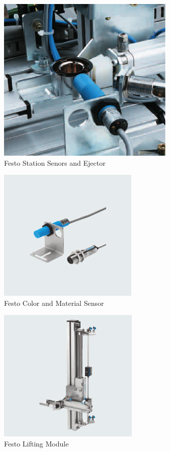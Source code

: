 \begin{figure}[H]
	\begin{center}
		\includegraphics[scale=.50]{media/FestoStation_SensorsAndEjector.png} 	
		\caption{Festo Station Senors and Ejector}
		\label{fig:festostationsensorsandejector}
	\end{center}
\end{figure}

\begin{figure}[H]
	\begin{center}
		\includegraphics[scale=.50]{media/FestoStation_ColorAndMaterialSensor.png} 	
		\caption{Festo Color and Material Sensor}
		\label{fig:festostationcolorandmaterialsensor}
	\end{center}
\end{figure}

\begin{figure}[H]
	\begin{center}
		\includegraphics[scale=.50]{media/FestoStation_LiftingModule.png} 	
		\caption{Festo Lifting Module}
		\label{fig:festostationliftingmodule}
	\end{center}
\end{figure}

